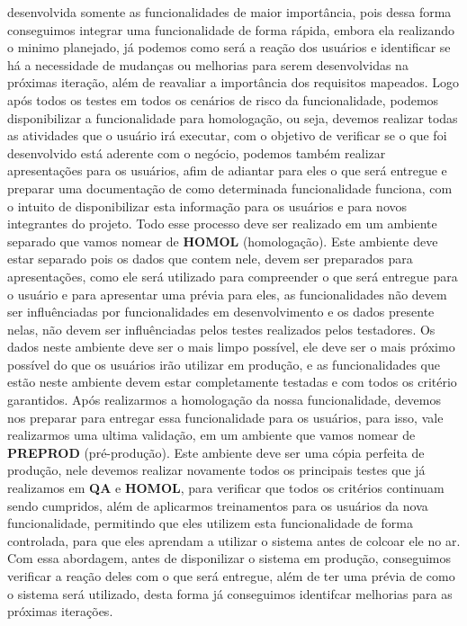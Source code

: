       desenvolvida somente as funcionalidades de maior importância, pois dessa
      forma conseguimos integrar uma funcionalidade de forma rápida, embora ela
      realizando o minimo planejado, já podemos como será a reação dos usuários e
      identificar se há a necessidade de mudanças ou melhorias para serem desenvolvidas
      na próximas iteração, além de reavaliar a importância dos requisitos mapeados. \newline
      Logo após todos os testes em todos os cenários de risco da funcionalidade,
      podemos disponibilizar a funcionalidade para homologação, ou seja, devemos
      realizar todas as atividades que o usuário irá executar, com o objetivo de
      verificar se o que foi desenvolvido está aderente com o negócio, podemos
      também realizar apresentações para os usuários, afim de adiantar para eles
      o que será entregue e preparar uma documentação de como determinada funcionalidade
      funciona, com o intuito de disponibilizar esta informação para os usuários e
      para novos integrantes do projeto. Todo esse processo deve ser realizado em
      um ambiente separado que vamos nomear de \textbf{HOMOL} (homologação). Este ambiente deve
      estar separado pois os dados que contem nele, devem ser preparados para
      apresentações, como ele será utilizado para compreender o que será entregue
      para o usuário e para apresentar uma prévia para eles, as funcionalidades
      não devem ser influênciadas por funcionalidades em desenvolvimento e os
      dados presente nelas, não devem ser influênciadas pelos testes realizados
      pelos testadores. Os dados neste ambiente deve ser o mais limpo possível,
      ele deve ser o mais próximo possível do que os usuários irão utilizar em
      produção, e as funcionalidades que estão neste ambiente devem estar completamente
      testadas e com todos os critério garantidos. \newline
      Após realizarmos a homologação da nossa funcionalidade, devemos nos preparar
      para entregar essa funcionalidade para os usuários, para isso, vale realizarmos
      uma ultima validação, em um ambiente que vamos nomear de \textbf{PREPROD}
      (pré-produção). Este ambiente deve ser uma cópia perfeita de produção, nele
      devemos realizar novamente todos os principais testes que já realizamos em
      \textbf{QA} e \textbf{HOMOL}, para verificar que todos os critérios continuam
      sendo cumpridos, além de aplicarmos treinamentos para os usuários da nova
      funcionalidade, permitindo que eles utilizem esta funcionalidade de forma
      controlada, para que eles aprendam a utilizar o sistema antes de colcoar ele
      no ar. Com essa abordagem, antes de disponilizar o sistema em produção,
      conseguimos verificar a reação deles com o que será entregue, além de ter uma
      prévia de como o sistema será utilizado, desta forma já conseguimos identifcar
      melhorias para as próximas iterações. \newline

